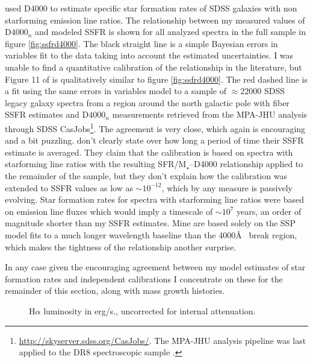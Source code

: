 \documentclass[modern]{aastex62}
\begin{document}
\citet{2004MNRAS.351.1151B} used D4000 to estimate specific star formation rates of SDSS galaxies with non starforming emission line ratios. The relationship between my measured values of D$4000_n$ and modeled SSFR is shown for all analyzed spectra in the full sample in figure \ref{fig:ssfrd4000}. The black straight line is a simple Bayesian errors in variables fit to the data taking into account the estimated uncertainties. I was unable to find a quantitative calibration of the relationship in the literature, but Figure 11 of \citet{2004MNRAS.351.1151B} is qualitatively similar to figure \ref{fig:ssfrd4000}. The red dashed line is a fit using the same errors in variables model to a sample of $\approx 22000$ SDSS legacy galaxy spectra from a region around the north galactic pole with fiber SSFR estimates and D$4000_n$ measurements retrieved from the MPA-JHU analysis through SDSS CasJobs\footnote{\url{http://skyserver.sdss.org/CasJobs/}. The MPA-JHU analysis pipeline was last applied to the DR8 spectroscopic sample \citep{2011ApJS..193...29A}.}. The agreement is very close, which again is encouraging and a bit puzzling. \citet{2004MNRAS.351.1151B} don't clearly state over how long a period of time their SSFR estimate is averaged. They claim that the calibration is based on spectra with starforming line ratios with the resulting SFR/M$_\star$--D4000 relationship applied to the remainder of the sample, but they don't explain how the calibration was extended to SSFR values as low as $\sim 10^{-12}$, which by any measure is passively evolving. Star formation rates for spectra with starforming line ratios were based on emission line fluxes which would imply a timescale of $\sim 10^7$ years, an order of magnitude shorter than my SSFR estimates. Mine are based solely on the SSP model fits to a much longer wavelength baseline than the 4000\AA~ break region, which makes the tightness of the relationship another surprise.

In any case given the encouraging agreement between my model estimates of star formation rates and independent calibrations I concentrate on these for the remainder of this section, along with mass growth histories.

\begin{figure}[ht]
\centering
{}
\caption{H$\alpha$ luminosity in erg/s., uncorrected for internal attenuation.}
\label{fig:halphamaps}
\end{figure}
\end{document}
